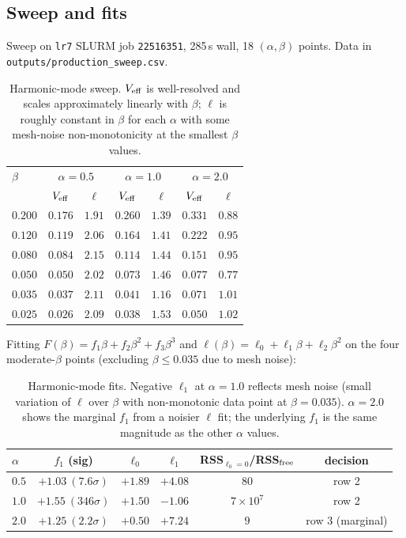 \documentclass[11pt]{article}
\begin{document}
\subsection{Sweep and fits}

Sweep on \texttt{lr7} SLURM job \texttt{22516351}, 285\,s wall, 18
$(\alpha,\beta)$ points.  Data in \texttt{outputs/production\_sweep.csv}.

\begin{table}[h]
\centering
\begin{tabular}{l|cc|cc|cc}\toprule
$\beta$ & \multicolumn{2}{c|}{$\alpha=0.5$} &
         \multicolumn{2}{c|}{$\alpha=1.0$} &
         \multicolumn{2}{c}{$\alpha=2.0$} \\
        & $V_{\rm eff}$ & $\ell$ & $V_{\rm eff}$ & $\ell$ & $V_{\rm eff}$ & $\ell$ \\\midrule
$0.200$ & $0.176$ & $1.91$ & $0.260$ & $1.39$ & $0.331$ & $0.88$ \\
$0.120$ & $0.119$ & $2.06$ & $0.164$ & $1.41$ & $0.222$ & $0.95$ \\
$0.080$ & $0.084$ & $2.15$ & $0.114$ & $1.44$ & $0.151$ & $0.95$ \\
$0.050$ & $0.050$ & $2.02$ & $0.073$ & $1.46$ & $0.077$ & $0.77$ \\
$0.035$ & $0.037$ & $2.11$ & $0.041$ & $1.16$ & $0.071$ & $1.01$ \\
$0.025$ & $0.026$ & $2.09$ & $0.038$ & $1.53$ & $0.050$ & $1.02$ \\\bottomrule
\end{tabular}
\caption{Harmonic-mode sweep.  $V_{\rm eff}$ is well-resolved and
scales approximately linearly with $\beta$; $\ell$ is roughly
constant in $\beta$ for each $\alpha$ with some mesh-noise
non-monotonicity at the smallest $\beta$ values.}
\label{tab:sweep-har}
\end{table}

Fitting $F(\beta)=f_1\beta+f_2\beta^2+f_3\beta^3$ and
$\ell(\beta)=\ell_0+\ell_1\beta+\ell_2\beta^2$ on the four
moderate-$\beta$ points (excluding $\beta\le 0.035$ due to mesh noise):

\begin{table}[h]
\centering
\begin{tabular}{lccccc}\toprule
$\alpha$ & $f_1$ (sig) & $\ell_0$ & $\ell_1$
         & RSS$_{\ell_0=0}$/RSS$_{\rm free}$ & decision \\\midrule
$0.5$ & $+1.03\ (7.6\sigma)$ & $+1.89$ & $+4.08$ & $80$ & row 2 \\
$1.0$ & $+1.55\ (346\sigma)$ & $+1.50$ & $-1.06$ & $7\times 10^7$ & row 2 \\
$2.0$ & $+1.25\ (2.2\sigma)$ & $+0.50$ & $+7.24$ & $9$ & row 3 (marginal) \\\bottomrule
\end{tabular}
\caption{Harmonic-mode fits.  Negative $\ell_1$ at $\alpha=1.0$
reflects mesh noise (small variation of $\ell$ over $\beta$ with
non-monotonic data point at $\beta=0.035$).  $\alpha=2.0$ shows the
marginal $f_1$ from a noisier $\ell$ fit; the underlying $f_1$ is
the same magnitude as the other $\alpha$ values.}
\label{tab:fits-har}
\end{table}
\end{document}
